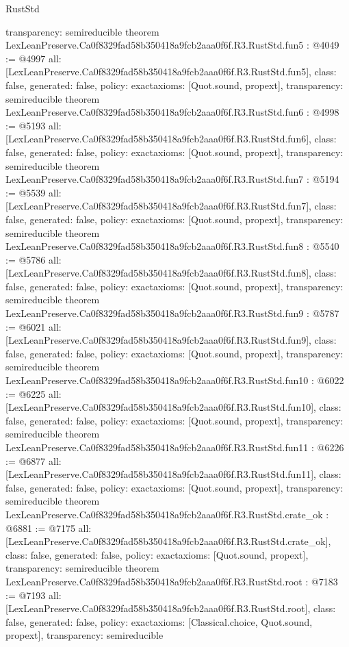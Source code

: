 \begin{lexlean}{RustStd}
\begin{coremodule}
{  transparency: semireducible
}
theorem LexLeanPreserve.Ca0f8329fad58b350418a9fcb2aaa0f6f.R3.RustStd.fun5 : @4049 := @4997 {
  all: [LexLeanPreserve.Ca0f8329fad58b350418a9fcb2aaa0f6f.R3.RustStd.fun5],
  class: false,
  generated: false,
  policy: exact{axioms: [Quot.sound, propext]},
  transparency: semireducible
}
theorem LexLeanPreserve.Ca0f8329fad58b350418a9fcb2aaa0f6f.R3.RustStd.fun6 : @4998 := @5193 {
  all: [LexLeanPreserve.Ca0f8329fad58b350418a9fcb2aaa0f6f.R3.RustStd.fun6],
  class: false,
  generated: false,
  policy: exact{axioms: [Quot.sound, propext]},
  transparency: semireducible
}
theorem LexLeanPreserve.Ca0f8329fad58b350418a9fcb2aaa0f6f.R3.RustStd.fun7 : @5194 := @5539 {
  all: [LexLeanPreserve.Ca0f8329fad58b350418a9fcb2aaa0f6f.R3.RustStd.fun7],
  class: false,
  generated: false,
  policy: exact{axioms: [Quot.sound, propext]},
  transparency: semireducible
}
theorem LexLeanPreserve.Ca0f8329fad58b350418a9fcb2aaa0f6f.R3.RustStd.fun8 : @5540 := @5786 {
  all: [LexLeanPreserve.Ca0f8329fad58b350418a9fcb2aaa0f6f.R3.RustStd.fun8],
  class: false,
  generated: false,
  policy: exact{axioms: [Quot.sound, propext]},
  transparency: semireducible
}
theorem LexLeanPreserve.Ca0f8329fad58b350418a9fcb2aaa0f6f.R3.RustStd.fun9 : @5787 := @6021 {
  all: [LexLeanPreserve.Ca0f8329fad58b350418a9fcb2aaa0f6f.R3.RustStd.fun9],
  class: false,
  generated: false,
  policy: exact{axioms: [Quot.sound, propext]},
  transparency: semireducible
}
theorem LexLeanPreserve.Ca0f8329fad58b350418a9fcb2aaa0f6f.R3.RustStd.fun10 : @6022 := @6225 {
  all: [LexLeanPreserve.Ca0f8329fad58b350418a9fcb2aaa0f6f.R3.RustStd.fun10],
  class: false,
  generated: false,
  policy: exact{axioms: [Quot.sound, propext]},
  transparency: semireducible
}
theorem LexLeanPreserve.Ca0f8329fad58b350418a9fcb2aaa0f6f.R3.RustStd.fun11 : @6226 := @6877 {
  all: [LexLeanPreserve.Ca0f8329fad58b350418a9fcb2aaa0f6f.R3.RustStd.fun11],
  class: false,
  generated: false,
  policy: exact{axioms: [Quot.sound, propext]},
  transparency: semireducible
}
theorem LexLeanPreserve.Ca0f8329fad58b350418a9fcb2aaa0f6f.R3.RustStd.crate_ok : @6881 := @7175 {
  all: [LexLeanPreserve.Ca0f8329fad58b350418a9fcb2aaa0f6f.R3.RustStd.crate_ok],
  class: false,
  generated: false,
  policy: exact{axioms: [Quot.sound, propext]},
  transparency: semireducible
}
theorem LexLeanPreserve.Ca0f8329fad58b350418a9fcb2aaa0f6f.R3.RustStd.root : @7183 := @7193 {
  all: [LexLeanPreserve.Ca0f8329fad58b350418a9fcb2aaa0f6f.R3.RustStd.root],
  class: false,
  generated: false,
  policy: exact{axioms: [Classical.choice, Quot.sound, propext]},
  transparency: semireducible
}


\end{coremodule}
\end{lexlean}
